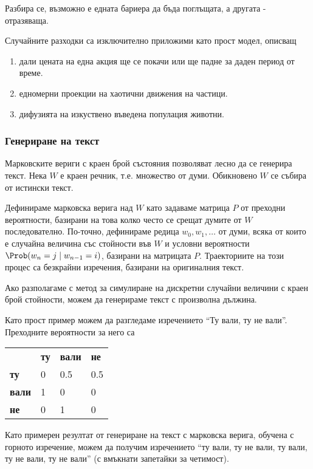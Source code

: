 \documentclass[numbers=endperiod, bibliography=totocnumbered]{scrartcl}
\begin{document}
Разбира се, възможно е едната бариера да бъда поглъщата, а другата - отразяваща.

Случайните разходки са изключително приложими като прост модел, описващ
\begin{enumerate}
  \item дали цената на една акция ще се покачи или ще падне за даден период от време.
  \item едномерни проекции на хаотични движения на частици.
  \item дифузията на изкуствено въведена популация животни.
\end{enumerate}

\subsubsection{Генериране на текст}

Марковските вериги с краен брой състояния позволяват лесно да се генерира текст. Нека \( W \) е краен речник, т.е. множество от думи. Обикновено \( W \) се събира от истински текст.

Дефинираме марковска верига над \( W \) като задаваме матрица \( P \) от преходни вероятности, базирани на това колко често се срещат думите от \( W \) последователно. По-точно, дефинираме редица \( w_0, w_1, \ldots \) от думи, всяка от които е случайна величина със стойности във \( W \) и условни вероятности \( \Prob(w_n = j \mid w_{n-1} = i) \), базирани на матрицата \( P \). Траекториите на този процес са безкрайни изречения, базирани на оригиналния текст.

Ако разполагаме с метод за симулиране на дискретни случайни величини с краен брой стойности, можем да генерираме текст с произволна дължина.

Като прост пример можем да разгледаме изречението \enquote{Ту вали, ту не вали}. Преходните вероятности за него са
\begin{center}
  \begin{tabular}{l l l l}
                    & \textbf{ту} & \textbf{вали} & \textbf{не} \\
      \textbf{ту}   & 0           & 0.5           & 0.5         \\
      \textbf{вали} & 1           & 0             & 0           \\
      \textbf{не}   & 0           & 1             & 0           \\
  \end{tabular}
\end{center}

Като примерен резултат от генериране на текст с марковска верига, обучена с горното изречение, можем да получим изречението \enquote{ту вали, ту не вали, ту вали, ту не вали, ту не вали} (с вмъкнати запетайки за четимост).

\printbibliography
\end{document}
